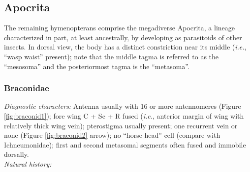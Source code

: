 \documentclass[letterpaper, 11pt]{article}
\begin{document}
\subsection{Apocrita}
The remaining hymenopterans comprise the megadiverse Apocrita, a lineage characterized in part, at least ancestrally, by developing as parasitoids of other insects. In dorsal view, the body has a distinct constriction near its middle (\textit{i.e.}, ``wasp waist'' present); note that the middle tagma is referred to as the ``mesosoma'' and the posteriormost tagma is the ``metasoma''. \\

\subsubsection{Braconidae}
\noindent{}\textit{Diagnostic characters:} Antenna usually with 16 or more antennomeres (Figure \ref{fig:braconid1}); fore wing C + Sc + R fused (\textit{i.e.}, anterior margin of wing with relatively thick wing vein); pterostigma usually present; one recurrent vein or none (Figure \ref{fig:braconid2} arrow); no ``horse head'' cell (compare with Ichneumonidae); first and second metasomal segments often fused and immobile dorsally.\\

\noindent{}\textit{Natural history:} \\
\end{document}
